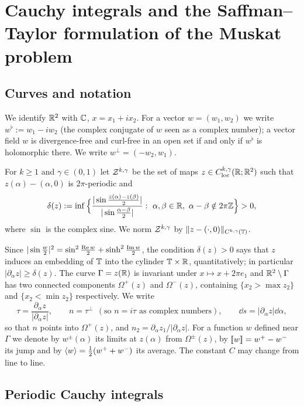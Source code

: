 \section{Cauchy integrals and the Saffman--Taylor formulation of the Muskat problem}\label{sec:muskat}

\subsection{Curves and notation}
We identify $\mathbb{R}^2$ with $\mathbb{C}$, $x=x_1+ix_2$. For a vector $w=(w_1,w_2)$ we write $w^\flat:=w_1-iw_2$ (the complex conjugate of $w$ seen as a complex number);
a vector field $w$ is divergence-free and curl-free in an open set if and only if $w^\flat$ is holomorphic there. We write $w^\perp=(-w_2,w_1)$.

\begin{definition}\label{def:curves}
For $k\ge1$ and $\gamma\in(0,1)$ let $\mathcal{Z}^{k,\gamma}$ be the set of maps $z\in C^{k,\gamma}_{\rm loc}(\mathbb{R};\mathbb{R}^2)$ such that $z(\alpha)-(\alpha,0)$ is $2\pi$-periodic and
\[
\delta(z):=\inf\Big\{\frac{|\sin\frac{z(\alpha)-z(\beta)}{2}|}{|\sin\frac{\alpha-\beta}{2}|}:\ \alpha,\beta\in\R,\ \alpha-\beta\notin2\pi\mathbb Z\Big\}>0,
\]
where $\sin$ is the complex sine. We norm $\mathcal{Z}^{k,\gamma}$ by $\|z-(\cdot,0)\|_{C^{k,\gamma}(\mathbb{T})}$.
\end{definition}

Since $|\sin\frac w2|^2=\sin^2\frac{\operatorname{Re} w}2+\sinh^2\frac{\operatorname{Im} w}2$, the condition $\delta(z)>0$ says that $z$ induces an embedding of $\mathbb{T}$ into the cylinder $\mathbb{T}\times\mathbb{R}$,
quantitatively; in particular $|\partial_\alpha z|\ge\delta(z)$. The curve $\Gamma=z(\mathbb{R})$ is invariant under $x\mapsto x+2\pi e_1$ and $\mathbb{R}^2\setminus\Gamma$ has two connected
components $\Omega^+(z)$ and $\Omega^-(z)$, containing $\{x_2>\max z_2\}$ and $\{x_2<\min z_2\}$ respectively. We write
\[
\tau=\frac{\partial_\alpha z}{|\partial_\alpha z|},\qquad n=\tau^\perp\ \ (\text{so } n=i\tau\text{ as complex numbers}),\qquad \dd s=|\partial_\alpha z|\dd\alpha,
\]
so that $n$ points into $\Omega^+(z)$, and $n_2=\partial_\alpha z_1/|\partial_\alpha z|$. For a function $w$ defined near $\Gamma$ we denote by $w^\pm(\alpha)$ its limits at $z(\alpha)$
from $\Omega^\pm(z)$, by $[\![w]\!]=w^+-w^-$ its jump and by $\langle w\rangle=\frac12(w^++w^-)$ its average. The constant $C$ may change from line to line.

\subsection{Periodic Cauchy integrals}

